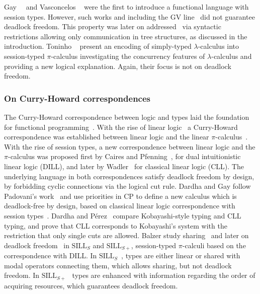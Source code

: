 \documentclass[main.tex]{subfiles}
\begin{document}
Gay~\etal~\cite{gaynagarajan03} and Vasconcelos \etal~\cite{vasconcelosravara04,vasconcelosgay06} were the first to introduce a functional language with session types. However, such works and including the GV line~\cite{gayvasconcelos10,gayvasconcelos12} did not guarantee deadlock freedom. This property was later on addressed~\cite{lindleymorris15,wadler15} via syntactic restrictions allowing only communication in tree structures, as discussed in the introduction. Toninho \etal~\cite{toninhocaires12} present an encoding of simply-typed $\lambda$-calculus into session-typed $\pi$-calculus investigating the concurrency features of $\lambda$-calculus and providing a new logical explanation. Again, their focus is not on deadlock freedom.

\subsubsection*{On Curry-Howard correspondences}
The Curry-Howard correspondence between logic and types laid the foundation for functional programming~\cite{wadler15}. With the rise of linear logic~\cite{girard87} a Curry-Howard correspondence was established between linear logic and the linear $\pi$-calculus~\cite{abramsky94,bellinscott94}. With the rise of session types, a new correspondence between linear logic and the $\pi$-calculus was proposed first by Caires and Pfenning~\cite{cairespfenning10}, for dual intuitionistic linear logic (DILL), and later by Wadler~\cite{wadler15} for classical linear logic (CLL). The underlying language in both correspondences satisfy deadlock freedom by design, by forbidding cyclic connections via the logical cut rule. Dardha and Gay follow Padovani's work~\cite{padovani14} and use priorities in CP to define a new calculus which is deadlock-free by design, based on classical linear logic correspondence with session types~\cite{wadler12}. Dardha and P\'{e}rez~\cite{dardhaperez15} compare Kobayashi-style typing and CLL typing, and prove that CLL corresponds to Kobayashi's system with the restriction that only single cuts are allowed. Balzer \etal study sharing~\cite{balzerpfenning17} and later on deadlock freedom~\cite{balzertoninho19} in $\text{SILL}_S$ and $\text{SILL}_{S+}$, session-typed $\pi$-calculi based on the correspondence with DILL. In $\text{SILL}_S$~\cite{balzerpfenning17}, types are either linear or shared with modal operators connecting them, which allows sharing, but not deadlock freedom. In $\text{SILL}_{S+}$~\cite{balzertoninho19} types are enhanced with information regarding the order of acquiring resources, which guarantees deadlock freedom.
\end{document}
